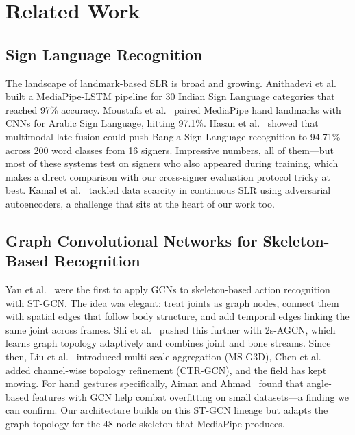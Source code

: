 \documentclass[conference]{IEEEtran}
\begin{document}
\section{Related Work}

\subsection{Sign Language Recognition}

The landscape of landmark-based SLR is broad and growing. Anithadevi et al.~\cite{anithadevi2025} built a MediaPipe-LSTM pipeline for 30 Indian Sign Language categories that reached 97\% accuracy. Moustafa et al.~\cite{moustafa2023} paired MediaPipe hand landmarks with CNNs for Arabic Sign Language, hitting 97.1\%. Hasan et al.~\cite{hasan2025} showed that multimodal late fusion could push Bangla Sign Language recognition to 94.71\% across 200 word classes from 16 signers. Impressive numbers, all of them---but most of these systems test on signers who also appeared during training, which makes a direct comparison with our cross-signer evaluation protocol tricky at best. Kamal et al.~\cite{kamal2024} tackled data scarcity in continuous SLR using adversarial autoencoders, a challenge that sits at the heart of our work too.

\subsection{Graph Convolutional Networks for Skeleton-Based Recognition}

Yan et al.~\cite{yan2018stgcn} were the first to apply GCNs to skeleton-based action recognition with ST-GCN. The idea was elegant: treat joints as graph nodes, connect them with spatial edges that follow body structure, and add temporal edges linking the same joint across frames. Shi et al.~\cite{shi2019twostreamAGCN} pushed this further with 2s-AGCN, which learns graph topology adaptively and combines joint and bone streams. Since then, Liu et al.~\cite{liu2020msg3d} introduced multi-scale aggregation (MS-G3D), Chen et al.~\cite{chen2021ctrgcn} added channel-wise topology refinement (CTR-GCN), and the field has kept moving. For hand gestures specifically, Aiman and Ahmad~\cite{aiman2023} found that angle-based features with GCN help combat overfitting on small datasets---a finding we can confirm. Our architecture builds on this ST-GCN lineage but adapts the graph topology for the 48-node skeleton that MediaPipe produces.
\end{document}
